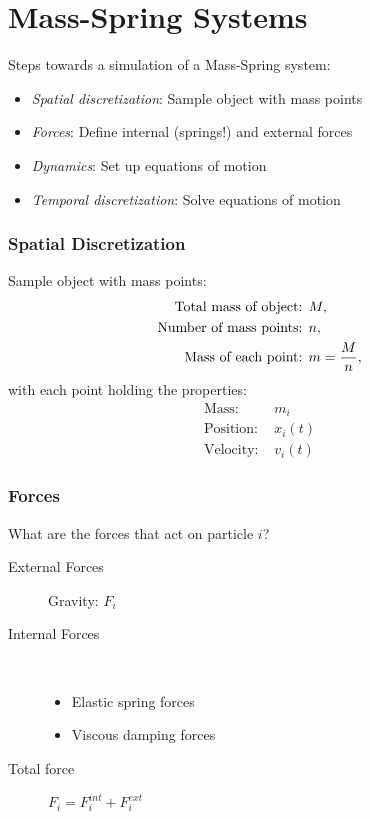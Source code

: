 \part{Mass-Spring Systems}
\begin{multicols}{2}
Steps towards a simulation of a Mass-Spring system:
\begin{itemize}
\item \emph{Spatial discretization}: Sample object with mass points
\item \emph{Forces}: Define internal (springs!) and external forces
\item \emph{Dynamics}: Set up equations of motion
\item \emph{Temporal discretization}: Solve equations of motion
\end{itemize}

\section{Spatial Discretization}
    Sample object with mass points:
    \begin{align*}
    	\text{Total mass of object: }& M,\\
    	\text{Number of mass points: }& n,\\
    	\text{Mass of each point: }& m = {M \over n},
    \end{align*}
    with each point holding the properties:
    \begin{align*}
    	\text{Mass: }&m_i\\
    	\text{Position: }& x_i(t)\\
    	\text{Velocity: }& v_i(t) 
    \end{align*}

\section{Forces}
 What are the forces that act on particle $i$?
	\begin{description}
		\item[External Forces] Gravity: $F_i$
		\item[Internal Forces] $\textbf{}$
			\begin{itemize}
				\item Elastic spring forces
				\item Viscous damping forces
			\end{itemize}
		\item[Total force] $F_i = F_i^{int} + F_i^{ext}$
	\end{description}


\end{multicols}
